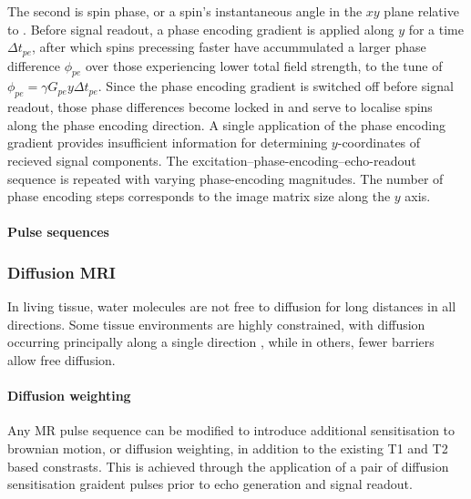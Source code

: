 The second is spin phase, or a spin's instantaneous angle in the $xy$ plane relative to .
Before signal readout, a phase encoding gradient is applied along $y$ for a time $\Delta t_{pe}$, after which spins precessing faster have accummulated a larger phase difference $\phi_{pe}$ over those experiencing lower total field strength, to the tune of $\phi_{pe}=\gamma G_{pe}y \Delta t_{pe}$.
Since the phase encoding gradient is switched off before signal readout, those phase differences become locked in and serve to localise spins along the phase encoding direction.
A single application of the phase encoding gradient provides insufficient information for determining $y$-coordinates of recieved signal components.
The excitation--phase-encoding--echo-readout sequence is repeated with varying phase-encoding magnitudes.
The number of phase encoding steps corresponds to the image matrix size along the $y$ axis.


\paragraph{Pulse sequences}



\subsubsection{Diffusion MRI}


In living tissue, water molecules are not free to diffusion for long distances in all directions. Some tissue environments are highly constrained, with diffusion occurring principally along a single direction , while in others, fewer barriers allow free diffusion.

\paragraph{Diffusion weighting}

Any MR pulse sequence can be modified to introduce additional sensitisation to brownian motion, or diffusion weighting, in addition to the existing T1 and T2 based constrasts.
This is achieved through the application of a pair of diffusion sensitisation graident pulses prior to echo generation and signal readout.

